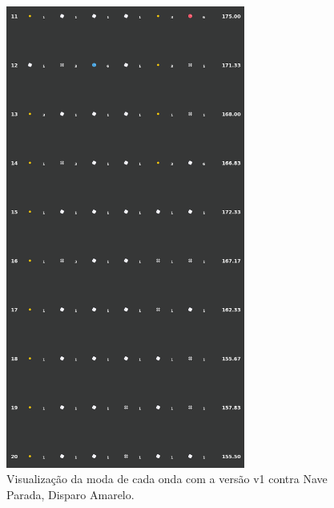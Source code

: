 \begin{figure}[H]
  \centering
  \includegraphics[width=0.7\textwidth]{figuras/ss/ss_yellowstill_ai_mode_1_2.png}
  \caption{Visualização da moda de cada onda com a versão v1 contra Nave Parada, Disparo Amarelo.}
  \label{fig:ss-moda-ys-1-2}
\end{figure}

